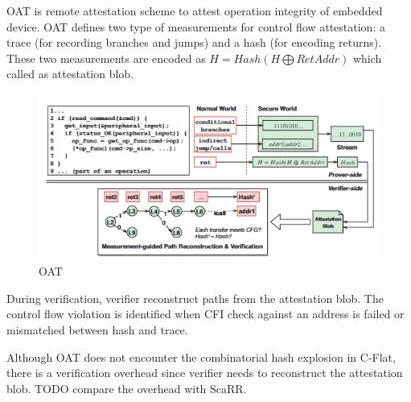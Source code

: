 OAT \cite{sunOATAttestingOperation2020} is remote attestation scheme to attest operation integrity of embedded device. OAT defines two type of measurements for control flow attestation: a trace (for recording branches and jumps) and a hash (for encoding returns). These two measurements are encoded as $H = Hash(H \bigoplus RetAddr)$ which called as attestation blob.

\begin{figure}[htbp]
\centerline{\includegraphics[scale=.5]{Figures/01/oat.png}}
\caption{OAT}
\label{fig:oat}
\end{figure}

During verification, verifier reconstruct paths from the attestation blob. The control flow violation is identified when CFI check against an address is failed or mismatched between hash and trace.

Although OAT does not encounter the combinatorial hash explosion in C-Flat, there is a verification overhead since verifier needs to reconstruct the attestation blob. TODO compare the overhead with ScaRR.
